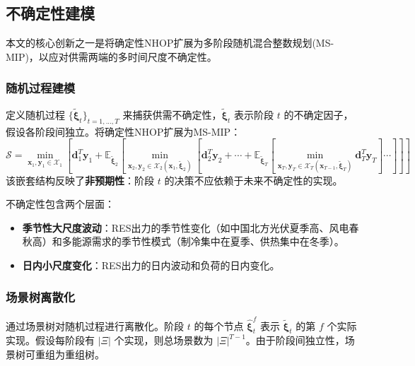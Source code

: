 \documentclass[11pt]{ctexart}
\begin{document}
\subsection{不确定性建模}

本文的核心创新之一是将确定性NHOP扩展为多阶段随机混合整数规划(MS-MIP)，以应对供需两端的多时间尺度不确定性。

\subsubsection{随机过程建模}

定义随机过程 $\{\tilde{\boldsymbol{\xi}}_t\}_{t=1,...,T}$ 来捕获供需不确定性，$\tilde{\boldsymbol{\xi}}_t$ 表示阶段 $t$ 的不确定因子，假设各阶段间独立。将确定性NHOP扩展为MS-MIP：
\begin{equation}
    \mathcal{S} = \min_{\boldsymbol{x}_1, \boldsymbol{y}_1 \in \mathcal{X}_1} \left[ \boldsymbol{d}_1^T \boldsymbol{y}_1 + \mathbb{E}_{\tilde{\boldsymbol{\xi}}_2} \left[ \min_{\boldsymbol{x}_2, \boldsymbol{y}_2 \in \mathcal{X}_2(\boldsymbol{x}_1, \tilde{\boldsymbol{\xi}}_2)} \left[ \boldsymbol{d}_2^T \boldsymbol{y}_2 + \cdots + \mathbb{E}_{\tilde{\boldsymbol{\xi}}_T} \left[ \min_{\boldsymbol{x}_T, \boldsymbol{y}_T \in \mathcal{X}_T(\boldsymbol{x}_{T-1}, \tilde{\boldsymbol{\xi}}_T)} \boldsymbol{d}_T^T \boldsymbol{y}_T \right] \cdots \right] \right] \right]
\end{equation}
该嵌套结构反映了\textbf{非预期性}：阶段 $t$ 的决策不应依赖于未来不确定性的实现。

不确定性包含两个层面：
\begin{itemize}[leftmargin=2em]
    \item \textbf{季节性大尺度波动}：RES出力的季节性变化（如中国北方光伏夏季高、风电春秋高）和多能源需求的季节性模式（制冷集中在夏季、供热集中在冬季）。
    \item \textbf{日内小尺度变化}：RES出力的日内波动和负荷的日内变化。
\end{itemize}

\subsubsection{场景树离散化}

通过场景树对随机过程进行离散化。阶段 $t$ 的每个节点 $\hat{\boldsymbol{\xi}}_t^f$ 表示 $\tilde{\boldsymbol{\xi}}_t$ 的第 $f$ 个实际实现。假设每阶段有 $|\Xi|$ 个实现，则总场景数为 $|\Xi|^{T-1}$。由于阶段间独立性，场景树可重组为重组树。
\end{document}
